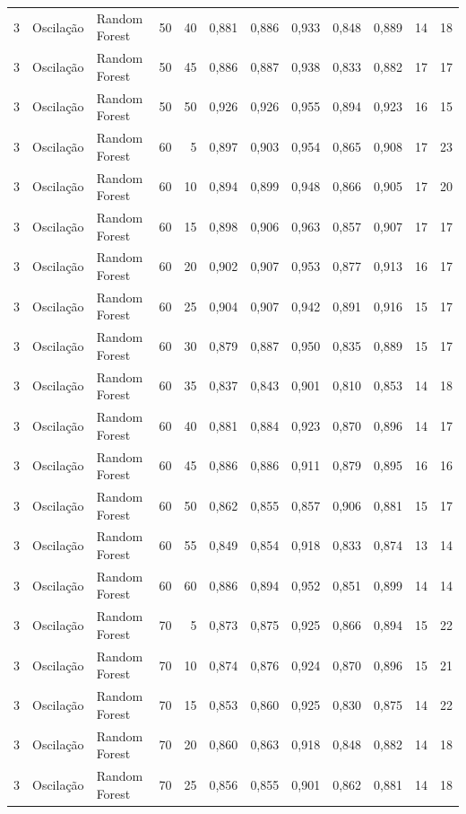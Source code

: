 \begin{longtable}{@{}rllrrrrrrrrr@{}}
3 & Oscilação & Random Forest & 50 & 40 & 0,881 & 0,886 & 0,933 & 0,848 & 0,889 & 14 & 18 \\
3 & Oscilação & Random Forest & 50 & 45 & 0,886 & 0,887 & 0,938 & 0,833 & 0,882 & 17 & 17 \\
3 & Oscilação & Random Forest & 50 & 50 & 0,926 & 0,926 & 0,955 & 0,894 & 0,923 & 16 & 15 \\
3 & Oscilação & Random Forest & 60 & 5 & 0,897 & 0,903 & 0,954 & 0,865 & 0,908 & 17 & 23 \\
3 & Oscilação & Random Forest & 60 & 10 & 0,894 & 0,899 & 0,948 & 0,866 & 0,905 & 17 & 20 \\
3 & Oscilação & Random Forest & 60 & 15 & 0,898 & 0,906 & 0,963 & 0,857 & 0,907 & 17 & 17 \\
3 & Oscilação & Random Forest & 60 & 20 & 0,902 & 0,907 & 0,953 & 0,877 & 0,913 & 16 & 17 \\
3 & Oscilação & Random Forest & 60 & 25 & 0,904 & 0,907 & 0,942 & 0,891 & 0,916 & 15 & 17 \\
3 & Oscilação & Random Forest & 60 & 30 & 0,879 & 0,887 & 0,950 & 0,835 & 0,889 & 15 & 17 \\
3 & Oscilação & Random Forest & 60 & 35 & 0,837 & 0,843 & 0,901 & 0,810 & 0,853 & 14 & 18 \\
3 & Oscilação & Random Forest & 60 & 40 & 0,881 & 0,884 & 0,923 & 0,870 & 0,896 & 14 & 17 \\
3 & Oscilação & Random Forest & 60 & 45 & 0,886 & 0,886 & 0,911 & 0,879 & 0,895 & 16 & 16 \\
3 & Oscilação & Random Forest & 60 & 50 & 0,862 & 0,855 & 0,857 & 0,906 & 0,881 & 15 & 17 \\
3 & Oscilação & Random Forest & 60 & 55 & 0,849 & 0,854 & 0,918 & 0,833 & 0,874 & 13 & 14 \\
3 & Oscilação & Random Forest & 60 & 60 & 0,886 & 0,894 & 0,952 & 0,851 & 0,899 & 14 & 14 \\
3 & Oscilação & Random Forest & 70 & 5 & 0,873 & 0,875 & 0,925 & 0,866 & 0,894 & 15 & 22 \\
3 & Oscilação & Random Forest & 70 & 10 & 0,874 & 0,876 & 0,924 & 0,870 & 0,896 & 15 & 21 \\
3 & Oscilação & Random Forest & 70 & 15 & 0,853 & 0,860 & 0,925 & 0,830 & 0,875 & 14 & 22 \\
3 & Oscilação & Random Forest & 70 & 20 & 0,860 & 0,863 & 0,918 & 0,848 & 0,882 & 14 & 18 \\
3 & Oscilação & Random Forest & 70 & 25 & 0,856 & 0,855 & 0,901 & 0,862 & 0,881 & 14 & 18 \\

\end{longtable}
